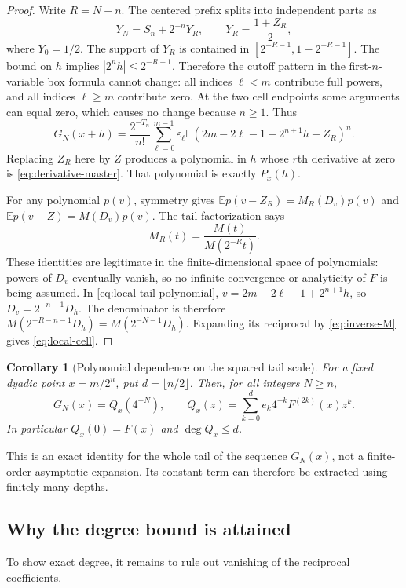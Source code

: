 \documentclass[11pt,a4paper]{article}
\numberwithin{equation}{section}
\newtheorem{corollary}[theorem]{Corollary}
\theoremstyle{definition}
\theoremstyle{remark}
\newcommand{\E}{\mathbb E}
\newcommand{\eps}{\varepsilon}
\begin{document}
\begin{proof}
Write $R=N-n$. The centered prefix splits into independent parts as
\[
 Y_N=S_n+2^{-n}Y_R,\qquad Y_R=\frac{1+Z_R}{2},
\]
where $Y_0=1/2$. The support of $Y_R$ is contained in
$[2^{-R-1},1-2^{-R-1}]$. The bound on $h$ implies
$|2^nh|\le2^{-R-1}$. Therefore the cutoff pattern in the first-$n$-variable box formula cannot change: all indices $\ell<m$ contribute full powers, and all indices $\ell\ge m$ contribute zero. At the two cell endpoints some arguments can equal zero, which causes no change because $n\ge1$. Thus
\begin{equation}
 G_N(x+h)=\frac{2^{-T_n}}{n!}
  \sum_{\ell=0}^{m-1}\eps_\ell
  \E(2m-2\ell-1+2^{n+1}h-Z_R)^n.
 \label{eq:local-tail-polynomial}
\end{equation}
Replacing $Z_R$ here by $Z$ produces a polynomial in $h$ whose $r$th derivative at zero is \cref{eq:derivative-master}. That polynomial is exactly $P_x(h)$.

For any polynomial $p(v)$, symmetry gives
$\E p(v-Z_R)=M_R(D_v)p(v)$ and
$\E p(v-Z)=M(D_v)p(v)$. The tail factorization says
\[
 M_R(t)=\frac{M(t)}{M(2^{-R}t)}.
\]
These identities are legitimate in the finite-dimensional space of polynomials: powers of $D_v$ eventually vanish, so no infinite convergence or analyticity of $F$ is being assumed. In \cref{eq:local-tail-polynomial}, $v=2m-2\ell-1+2^{n+1}h$, so $D_v=2^{-n-1}D_h$. The denominator is therefore
$M(2^{-R-n-1}D_h)=M(2^{-N-1}D_h)$.
Expanding its reciprocal by \cref{eq:inverse-M} gives \cref{eq:local-cell}.
\end{proof}

\begin{corollary}[Polynomial dependence on the squared tail scale]
\label{cor:scale-polynomial}
For a fixed dyadic point $x=m/2^n$, put $d=\lfloor n/2\rfloor$. Then, for all integers $N\ge n$,
\begin{equation}
 G_N(x)=Q_x(4^{-N}),\qquad
 Q_x(z)=\sum_{k=0}^{d}e_k4^{-k}F^{(2k)}(x)z^k.
 \label{eq:Qx}
\end{equation}
In particular $Q_x(0)=F(x)$ and $\deg Q_x\le d$.
\end{corollary}
This is an exact identity for the whole tail of the sequence $G_N(x)$, not a finite-order asymptotic expansion. Its constant term can therefore be extracted using finitely many depths.

\subsection{Why the degree bound is attained}
To show exact degree, it remains to rule out vanishing of the reciprocal coefficients.
\end{document}
